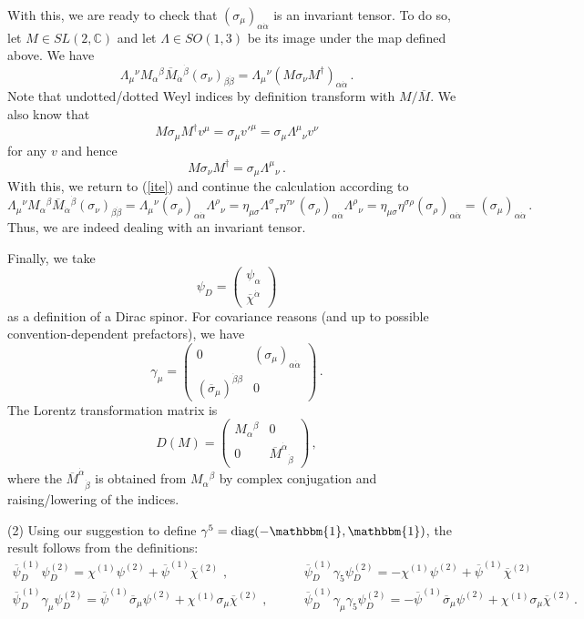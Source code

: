 \documentclass[12pt]{article}
\newcommand{\be}{\begin{equation}}
\newcommand{\ee}{\end{equation}}
\newcommand{\bea}{\begin{eqnarray}}
\newcommand{\eea}{\end{eqnarray}}
\newcommand{\ol}{\overline}
\numberwithin{equation}{section}
\begin{document}
With this, we are ready to check that $(\sigma_\mu)_{\alpha\dot{\alpha}}$ is an invariant tensor. To do so, let $M\in SL(2,\mathbb{C})$ and let $\Lambda\in SO(1,3)$ be its image under the map defined above. We have
\be
\Lambda_\mu{}^\nu M_\alpha{}^\beta \ol{M}_{\dot{\alpha}}{}^{\dot{\beta}} (\sigma_\nu)_{\beta\dot{\beta}}=\Lambda_\mu{}^\nu (M\sigma_\nu M^\dagger)_{\alpha\dot{\alpha}}\,.\label{ite}
\ee
Note that undotted/dotted Weyl indices by definition transform with $M/\ol{M}$. We also know that
\be
M\sigma_\mu M^\dagger v^\mu = \sigma_\mu v'^\mu=\sigma_\mu\Lambda^\mu{}_\nu v^\nu
\ee
for any $v$ and hence
\be
M\sigma_\nu M^\dagger=\sigma_\mu\Lambda^\mu{}_\nu\,.
\ee
With this, we return to (\ref{ite}) and continue the calculation according to
\be
\Lambda_\mu{}^\nu M_\alpha{}^\beta \ol{M}_{\dot{\alpha}}{}^{\dot{\beta}} (\sigma_\nu)_{\beta\dot{\beta}} = \Lambda_\mu{}^\nu (\sigma_\rho)_{\alpha\dot{\alpha}} \Lambda^\rho{}_\nu=\eta_{\mu\sigma} \Lambda^\sigma{}_\tau \eta^{\tau\nu}\, (\sigma_\rho)_{\alpha\dot{\alpha}} \Lambda^\rho{}_\nu =\eta_{\mu\sigma}\eta^{\sigma\rho} (\sigma_\rho)_{\alpha\dot{\alpha}} = (\sigma_\mu)_{\alpha\dot{\alpha}}\,.
\ee
Thus, we are indeed dealing with an invariant tensor. 

Finally, we take
\be
\psi_D=\left(\begin{array}{c}\psi_\alpha\\ \ol{\chi}^{\dot{\alpha}} \end{array}\right)
\ee
as a definition of a Dirac spinor. For covariance reasons (and up to possible convention-dependent prefactors), we have
\be
\gamma_\mu=\left(\begin{array}{cc} 0 & (\sigma_\mu)_{\alpha\dot{\alpha}} \\ (\ol{\sigma}_\mu)^{\dot{\beta}\beta} & 0 \end{array}\right)\,.
\ee
The Lorentz transformation matrix is
\be
D(M)=\left(\begin{array}{cc} M_\alpha{}^\beta & 0 \\ 0 & \ol{M}^{\dot{\alpha}}{}_{\dot{\beta}} \end{array}\right)\,,
\ee
where the $\ol{M}^{\dot{\alpha}}{}_{\dot{\beta}}$ is obtained from $M_\alpha{}^\beta$ by complex conjugation and raising/lowering of the indices.

\noindent 
(2) Using our suggestion to define $\gamma^5=\mbox{diag}(-\mathbbm{1},\mathbbm{1})$, the result follows from the definitions:
\bea
\ol{\psi}^{(1)}_D\psi^{(2)}_D = \chi^{(1)}\psi^{(2)}+\ol{\psi}^{(1)}\ol{\chi}^{(2)}\,\,,\quad&\quad 
\ol{\psi}^{(1)}_D\gamma_5\psi^{(2)}_D = -\chi^{(1)}\psi^{(2)}+\ol{\psi}^{(1)}\ol{\chi}^{(2)}
\\
\ol{\psi}^{(1)}_D\gamma_\mu\psi^{(2)}_D = \ol{\psi}^{(1)}\ol{\sigma}_\mu\psi^{(2)}+\chi^{(1)}\sigma_\mu \ol{\chi}^{(2)}
\,\,,\quad&\quad
\ol{\psi}^{(1)}_D\gamma_\mu\gamma_5\psi^{(2)}_D =
- \ol{\psi}^{(1)}\ol{\sigma}_\mu\psi^{(2)}+\chi^{(1)}\sigma_\mu \ol{\chi}^{(2)}\,.
\eea
\end{document}
